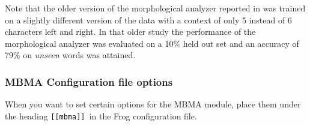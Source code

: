 \documentclass{book}
\begin{document}
Note that the older version of the morphological analyzer reported in \cite{Tadpole} was trained on a slightly different version of the data with a context of only 5 instead of 6 characters left and right.
In that older study the performance of the morphological analyzer was evaluated on a 10\% held out set and an accuracy of 79\% on {\it unseen} words was attained.

\subsubsection{MBMA Configuration file options}
When you want to set certain options for the MBMA module, place them under the heading {\tt [[mbma]] }in the Frog configuration file.

\end{document}
